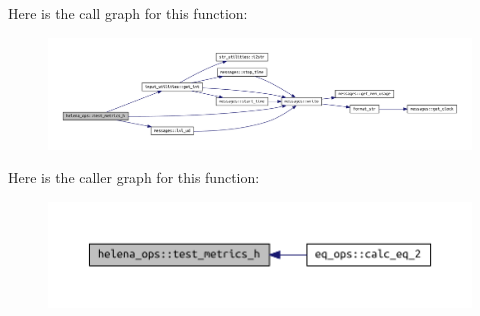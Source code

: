 Here is the call graph for this function\+:
\nopagebreak
\begin{figure}[H]
\begin{center}
\leavevmode
\includegraphics[width=350pt]{namespacehelena__ops_a0f156b3653264fb016d6d311eb59114c_cgraph}
\end{center}
\end{figure}
Here is the caller graph for this function\+:
\nopagebreak
\begin{figure}[H]
\begin{center}
\leavevmode
\includegraphics[width=350pt]{namespacehelena__ops_a0f156b3653264fb016d6d311eb59114c_icgraph}
\end{center}
\end{figure}
